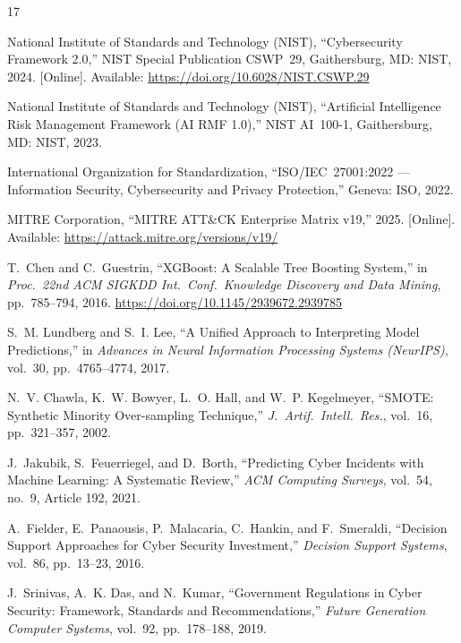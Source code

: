 \documentclass[journal]{IEEEtran}
\begin{document}
\begin{thebibliography}{17}

National Institute of Standards and Technology (NIST),
``Cybersecurity Framework 2.0,''
NIST Special Publication CSWP~29, Gaithersburg, MD: NIST, 2024.
[Online]. Available: \url{https://doi.org/10.6028/NIST.CSWP.29}

National Institute of Standards and Technology (NIST),
``Artificial Intelligence Risk Management Framework (AI RMF 1.0),''
NIST AI~100-1, Gaithersburg, MD: NIST, 2023.

International Organization for Standardization,
``ISO/IEC~27001:2022 --- Information Security, Cybersecurity and Privacy
Protection,'' Geneva: ISO, 2022.

MITRE Corporation,
``MITRE ATT\&CK Enterprise Matrix v19,'' 2025.
[Online]. Available: \url{https://attack.mitre.org/versions/v19/}

T.~Chen and C.~Guestrin,
``XGBoost: A Scalable Tree Boosting System,''
in \emph{Proc.\ 22nd ACM SIGKDD Int.\ Conf.\ Knowledge Discovery and Data
Mining}, pp.~785--794, 2016.
\url{https://doi.org/10.1145/2939672.2939785}

S.~M. Lundberg and S.~I. Lee,
``A Unified Approach to Interpreting Model Predictions,''
in \emph{Advances in Neural Information Processing Systems (NeurIPS)},
vol.~30, pp.~4765--4774, 2017.

N.~V. Chawla, K.~W. Bowyer, L.~O. Hall, and W.~P. Kegelmeyer,
``SMOTE: Synthetic Minority Over-sampling Technique,''
\emph{J.\ Artif.\ Intell.\ Res.}, vol.~16, pp.~321--357, 2002.

J.~Jakubik, S.~Feuerriegel, and D.~Borth,
``Predicting Cyber Incidents with Machine Learning: A Systematic Review,''
\emph{ACM Computing Surveys}, vol.~54, no.~9, Article 192, 2021.

A.~Fielder, E.~Panaousis, P.~Malacaria, C.~Hankin, and F.~Smeraldi,
``Decision Support Approaches for Cyber Security Investment,''
\emph{Decision Support Systems}, vol.~86, pp.~13--23, 2016.

J.~Srinivas, A.~K. Das, and N.~Kumar,
``Government Regulations in Cyber Security: Framework, Standards and
Recommendations,''
\emph{Future Generation Computer Systems}, vol.~92, pp.~178--188, 2019.


\end{thebibliography}
\end{document}
